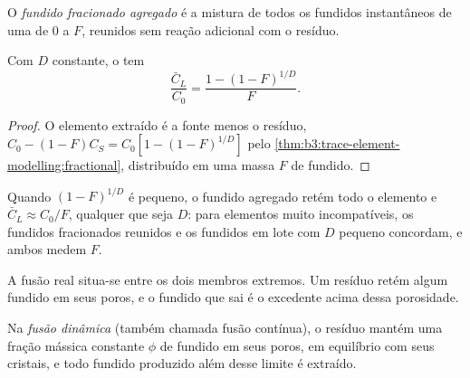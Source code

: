 \begin{omfigure}
\par{}\label{fig:b3:trace-element-modelling:curves}
\end{omfigure}

\begin{definition}\label{def:b3:trace-element-modelling:fractional}
O \emph{fundido fracionado agregado} é a
mistura de todos os fundidos instantâneos de uma  de $0$ a
$F$, reunidos sem reação adicional com o resíduo.
\end{definition}

\begin{proposition}
\label{prop:b3:trace-element-modelling:aggregate}
Com $D$ constante, o  tem
\[
\frac{\bar C_L}{C_0} = \frac{1 - (1 - F)^{1/D}}{F}.
\]
\end{proposition}

\begin{proof}
O elemento extraído é a fonte menos o resíduo,
$C_0 - (1 - F)C_S = C_0[1 - (1 - F)^{1/D}]$ pelo \cref{thm:b3:trace-element-modelling:fractional},
distribuído em uma massa $F$ de fundido.
\end{proof}

Quando $(1 - F)^{1/D}$ é pequeno, o fundido agregado retém todo o
elemento e $\bar C_L \approx C_0/F$, qualquer que seja $D$: para elementos muito incompatíveis,
os fundidos fracionados reunidos e os fundidos em lote com $D$ pequeno concordam, e
ambos medem $F$.

A fusão real situa-se entre os dois membros extremos. Um resíduo retém algum fundido em
seus poros, e o fundido que sai é o excedente acima dessa porosidade.

\begin{definition}\label{def:b3:trace-element-modelling:dynamic}
Na \emph{fusão dinâmica} (também chamada fusão
contínua), o resíduo mantém uma fração mássica constante $\phi$ de fundido em
seus poros, em equilíbrio com seus cristais, e todo fundido produzido além desse limite
é extraído.
\end{definition}

